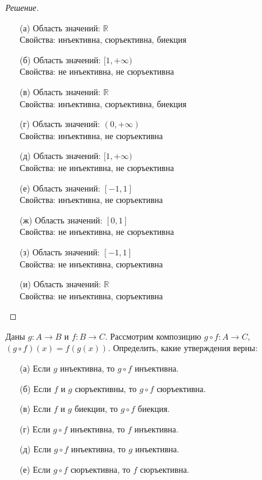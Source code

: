 \documentclass{article}
\begin{document}
\begin{proof}[Решение]\
\begin{enumerate}
    \item[(а)] Область значений: $\mathbb{R}$ \\
     Свойства: инъективна, сюръективна, биекция
    
    \item[(б)] Область значений: $[1, +\infty)$ \\
     Свойства: не инъективна, не сюръективна 
    
    \item[(в)] Область значений: $\mathbb{R}$ \\
     Свойства: инъективна, сюръективна, биекция
    
    \item[(г)] Область значений: $(0, +\infty)$ \\
     Свойства: инъективна, не сюръективна
    
    \item[(д)] Область значений: $[1, +\infty)$ \\
    Свойства: не инъективна, не сюръективна
    
    \item[(е)] Область значений: $[-1, 1]$ \\
    Свойства: инъективна, не сюръективна
    
    \item[(ж)] Область значений: $[0, 1]$ \\
    Свойства: не инъективна, не сюръективна
    
    \item[(з)] Область значений: $[-1, 1]$ \\
    Свойства: не инъективна, сюръективна
    
    \item[(и)] Область значений: $\mathbb{R}$ \\
    Свойства: не инъективна, сюръективна
\end{enumerate}
\end{proof}

\begin{task}[2]
Даны $g : A \to B$ и $f : B \to C$. Рассмотрим композицию $g\circ f : A \to C$, $(g\circ f)(x)=f(g(x))$. Определить, какие утверждения верны:
\begin{enumerate}
    \item[(а)] Если $g$ инъективна, то $g\circ f$ инъективна.
    \item[(б)] Если $f$ и $g$ сюръективны, то $g\circ f$ сюръективна.
    \item[(в)] Если $f$ и $g$ биекции, то $g\circ f$ биекция.
    \item[(г)] Если $g\circ f$ инъективна, то $f$ инъективна.
    \item[(д)] Если $g\circ f$ инъективна, то $g$ инъективна.
    \item[(е)] Если $g\circ f$ сюръективна, то $f$ сюръективна.
\end{enumerate}
\end{task}
\end{document}
